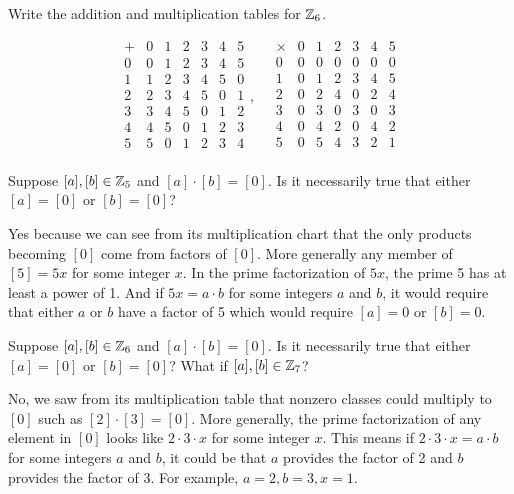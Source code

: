 \documentclass{article}
\begin{document}
\begin{problem}
Write the addition and multiplication tables for $\mathbb{Z}_6$.
\end{problem}
$$\begin{array}{c|cccccc}
    + & 0 & 1 & 2 & 3 & 4 & 5 \\
    \hline
    0 & 0 & 1 & 2 & 3 & 4 & 5 \\
    1 & 1 & 2 & 3 & 4 & 5 & 0 \\
    2 & 2 & 3 & 4 & 5 & 0 & 1 \\
    3 & 3 & 4 & 5 & 0 & 1 & 2 \\
    4 & 4 & 5 & 0 & 1 & 2 & 3 \\
    5 & 5 & 0 & 1 & 2 & 3 & 4 \\
  \end{array}, \quad
  \begin{array}{c|cccccc}
    \times & 0 & 1 & 2 & 3 & 4 & 5 \\
    \hline
    0      & 0 & 0 & 0 & 0 & 0 & 0 \\
    1      & 0 & 1 & 2 & 3 & 4 & 5 \\
    2      & 0 & 2 & 4 & 0 & 2 & 4 \\
    3      & 0 & 3 & 0 & 3 & 0 & 3 \\
    4      & 0 & 4 & 2 & 0 & 4 & 2 \\
    5      & 0 & 5 & 4 & 3 & 2 & 1 \\
  \end{array}$$

\begin{problem}
Suppose $[a], [b] \in \mathbb{Z}_5$ and $[a] \cdot [b] = [0]$. Is it necessarily true that either $[a] = [0]$ or $[b] = [0]$?
\end{problem}

Yes because we can see from its multiplication chart that the only products becoming $[0]$ come from factors of $[0]$. More generally any member of $[5] = 5x$ for some integer $x$. In the prime factorization of $5x$, the prime 5 has at least a power of 1. And if $5x = a \cdot b$ for some integers $a$ and $b$, it would require that either $a$ or $b$ have a factor of 5 which would require $[a] = 0$ or $[b] = 0$.

\begin{problem}
Suppose $[a], [b] \in \mathbb{Z}_6$ and $[a] \cdot [b] = [0]$. Is it necessarily true that either $[a] = [0]$ or $[b] = [0]$? What if $[a], [b] \in \mathbb{Z}_7$?
\end{problem}

No, we saw from its multiplication table that nonzero classes could multiply to $[0]$ such as $[2] \cdot [3] = [0]$. More generally, the prime factorization of any element in $[0]$ looks like $2\cdot3\cdot x$ for some integer $x$. This means if $2\cdot 3 \cdot x = a \cdot b$ for some integers $a$ and $b$, it could be that $a$ provides the factor of 2 and $b$ provides the factor of 3. For example, $a = 2, b = 3, x = 1$.
\end{document}
